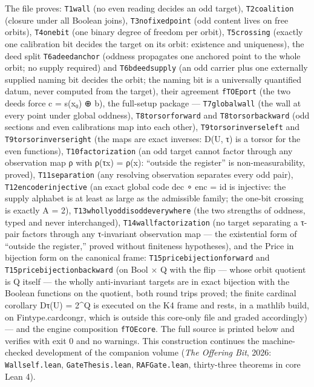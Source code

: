 \documentclass[10pt]{article}
\renewcommand{\_}{\origunderscore\allowbreak}
\begin{document}
The file proves: \texttt{T1\_wall} (no even reading decides an odd
target), \texttt{T2\_coalition} (closure under all Boolean joins),
\texttt{T3\_no\_fixed\_point} (odd content lives on free orbits),
\texttt{T4\_one\_bit} (one binary degree of freedom per orbit),
\texttt{T5\_crossing} (exactly one calibration bit decides the target on
its orbit: existence and uniqueness), the deed split
\texttt{T6a\_deed\_anchor} (oddness propagates one anchored point to the
whole orbit; no supply required) and \texttt{T6b\_deed\_supply} (an odd
carrier plus one externally supplied naming bit decides the orbit; the
naming bit is a universally quantified datum, never computed from the
target), their agreement \texttt{fTOE\_port} (the two deeds force c =
s(x₀) ⊕ b), the full-setup package --- \texttt{T7\_global\_wall} (the
wall at every point under global oddness), \texttt{T8\_torsor\_forward}
and \texttt{T8\_torsor\_backward} (odd sections and even calibrations
map into each other), \texttt{T9\_torsor\_inverse\_left} and
\texttt{T9\_torsor\_inverse\_right} (the maps are exact inverses: D(U,
τ) is a torsor for the even functions), \texttt{T10\_factorization} (an
odd target cannot factor through any observation map ρ with ρ(τx) =
ρ(x): ``outside the register'' is non-measurability, proved),
\texttt{T11\_separation} (any resolving observation separates every odd
pair), \texttt{T12\_encoder\_injective} (an exact global code dec ∘ enc
= id is injective: the supply alphabet is at least as large as the
admissible family; the one-bit crossing is exactly \textbar A\textbar{}
= 2), \texttt{T13\_wholly\_odd\_is\_odd\_everywhere} (the two strengths
of oddness, typed and never interchanged),
\texttt{T14\_wall\_factorization} (no target separating a τ-pair factors
through any τ-invariant observation map --- the existential form of
``outside the register,'' proved without finiteness hypotheses), and the
Price in bijection form on the canonical frame:
\texttt{T15\_price\_bijection\_forward} and
\texttt{T15\_price\_bijection\_backward} (on Bool × Q with the flip ---
whose orbit quotient is Q itself --- the wholly anti-invariant targets
are in exact bijection with the Boolean functions on the quotient, both
round trips proved; the finite cardinal corollary
\textbar Dτ(U)\textbar{} = 2\^{}\textbar Q\textbar{} is executed on the
K4 frame and rests, in a mathlib build, on Fintype.card\_congr, which is
outside this core-only file and graded accordingly) --- and the engine
composition \texttt{fTOE\_core}. The full source is printed below and
verifies with exit 0 and no warnings. This construction continues the
machine-checked development of the companion volume (\emph{The Offering
Bit}, 2026: \texttt{Wallself.lean}, \texttt{GateThesis.lean},
\texttt{RAFGate.lean}, thirty-three theorems in core Lean 4).
\end{document}
